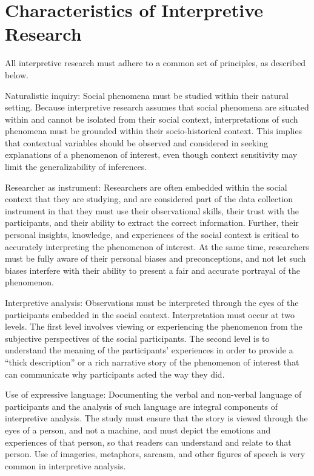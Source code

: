 \section{Characteristics of Interpretive Research}

All interpretive research must adhere to a common set of principles, as described below.

Naturalistic inquiry: Social phenomena must be studied within their natural setting. Because interpretive research assumes that social phenomena are situated within and cannot be isolated from their social context, interpretations of such phenomena must be grounded within their socio-historical context. This implies that contextual variables should be observed and considered in seeking explanations of a phenomenon of interest, even though context sensitivity may limit the generalizability of inferences.

Researcher as instrument: Researchers are often embedded within the social context that they are studying, and are considered part of the data collection instrument in that they must use their observational skills, their trust with the participants, and their ability to extract the correct information. Further, their personal insights, knowledge, and experiences of the social context is critical to accurately interpreting the phenomenon of interest. At the same time, researchers must be fully aware of their personal biases and preconceptions, and not let such biases interfere with their ability to present a fair and accurate portrayal of the phenomenon.

Interpretive analysis: Observations must be interpreted through the eyes of the participants embedded in the social context. Interpretation must occur at two levels. The first level involves viewing or experiencing the phenomenon from the subjective perspectives of the social participants. The second level is to understand the meaning of the participants’ experiences in order to provide a “thick description” or a rich narrative story of the phenomenon of interest that can communicate why participants acted the way they did.

Use of expressive language: Documenting the verbal and non-verbal language of participants and the analysis of such language are integral components of interpretive analysis. The study must ensure that the story is viewed through the eyes of a person, and not a machine, and must depict the emotions and experiences of that person, so that readers can understand and relate to that person. Use of imageries, metaphors, sarcasm, and other figures of speech is very common in interpretive analysis.

